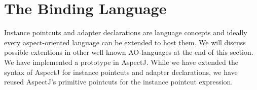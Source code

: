 \documentclass{llncs}
\begin{document}
%
%
%
%
%


\section{The Binding Language}

Instance pointcuts and adapter declarations are language concepts and ideally every aspect-oriented language can be extended to host them. We will discuss possible extentions in other well known AO-languages at the end of this section. 
We have implemented a prototype in AspectJ. While we have extended the syntax of AspectJ for instance pointcuts and adapter declarations, we have reused AspectJ's primitive pointcuts for the instance pointcut expression. 
\end{document}
